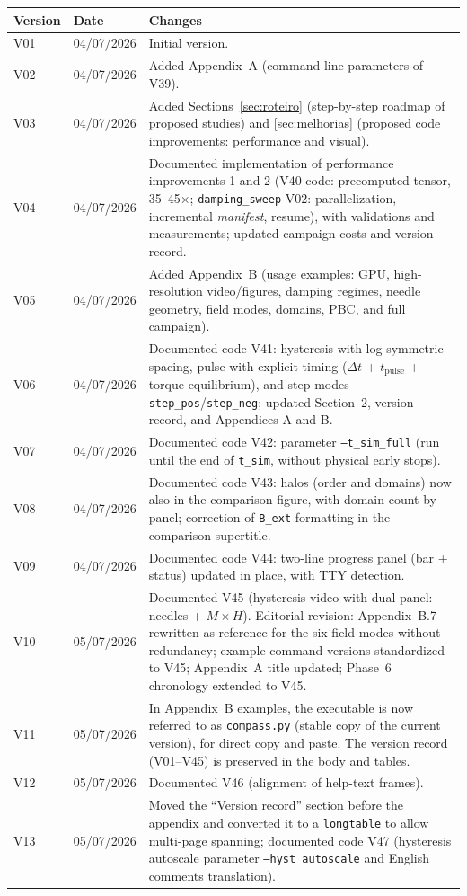\documentclass[11pt,a4paper]{article}
\newcommand{\code}[1]{\texttt{#1}}
\begin{document}
\begin{tabular}{@{}lll@{}}
\toprule
\textbf{Version} & \textbf{Date} & \textbf{Changes} \\
\midrule
V01 & 04/07/2026 & Initial version. \\
V02 & 04/07/2026 & Added Appendix~A (command-line parameters of V39). \\
V03 & 04/07/2026 & Added Sections~\ref{sec:roteiro} (step-by-step roadmap of proposed studies) and \ref{sec:melhorias} (proposed code improvements: performance and visual). \\
V04 & 04/07/2026 & Documented implementation of performance improvements 1 and 2 (V40 code: precomputed tensor, 35--45$\times$; \code{damping\_sweep} V02: parallelization, incremental \emph{manifest}, resume), with validations and measurements; updated campaign costs and version record. \\
V05 & 04/07/2026 & Added Appendix~B (usage examples: GPU, high-resolution video/figures, damping regimes, needle geometry, field modes, domains, PBC, and full campaign). \\
V06 & 04/07/2026 & Documented code V41: hysteresis with log-symmetric spacing, pulse with explicit timing ($\Delta t$ + $t_{\mathrm{pulse}}$ + torque equilibrium), and step modes \code{step\_pos}/\code{step\_neg}; updated Section~2, version record, and Appendices A and B. \\
V07 & 04/07/2026 & Documented code V42: parameter \code{--t\_sim\_full} (run until the end of \code{t\_sim}, without physical early stops). \\
V08 & 04/07/2026 & Documented code V43: halos (order and domains) now also in the comparison figure, with domain count by panel; correction of \code{B\_ext} formatting in the comparison supertitle. \\
V09 & 04/07/2026 & Documented code V44: two-line progress panel (bar + status) updated in place, with TTY detection. \\
V10 & 05/07/2026 & Documented V45 (hysteresis video with dual panel: needles + $M\times H$). Editorial revision: Appendix~B.7 rewritten as reference for the six field modes without redundancy; example-command versions standardized to V45; Appendix~A title updated; Phase~6 chronology extended to V45. \\
V11 & 05/07/2026 & In Appendix~B examples, the executable is now referred to as \code{compass.py} (stable copy of the current version), for direct copy and paste. The version record (V01--V45) is preserved in the body and tables. \\
V12 & 05/07/2026 & Documented V46 (alignment of help-text frames). \\
V13 & 05/07/2026 & Moved the ``Version record'' section before the appendix and converted it to a \code{longtable} to allow multi-page spanning; documented code V47 (hysteresis autoscale parameter \code{--hyst\_autoscale} and English comments translation). \\
\bottomrule
\end{tabular}
\end{document}
